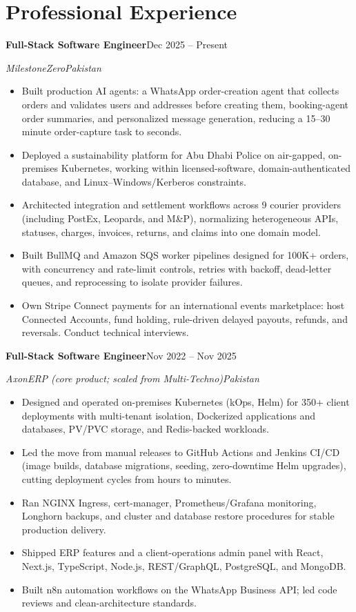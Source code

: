 \documentclass[letterpaper,10pt]{article}
\newcommand{\role}[4]{%
  \textbf{#1}\hfill #2\par
  \textit{#3}\hfill \textit{#4}\par}
\begin{document}
\section{Professional Experience}
\role{Full-Stack Software Engineer}{Dec 2025 -- Present}{MilestoneZero}{Pakistan}
\begin{itemize}
  \item Built production AI agents: a WhatsApp order-creation agent that collects orders and validates users and
        addresses before creating them, booking-agent order summaries, and personalized message generation,
        reducing a 15--30 minute order-capture task to seconds.
  \item Deployed a sustainability platform for Abu Dhabi Police on air-gapped, on-premises Kubernetes, working
        within licensed-software, domain-authenticated database, and Linux--Windows/Kerberos constraints.
  \item Architected integration and settlement workflows across 9 courier providers (including PostEx, Leopards,
        and M\&P), normalizing heterogeneous APIs, statuses, charges, invoices, returns, and claims into one domain model.
  \item Built BullMQ and Amazon SQS worker pipelines designed for 100K+ orders, with concurrency and rate-limit
        controls, retries with backoff, dead-letter queues, and reprocessing to isolate provider failures.
  \item Own Stripe Connect payments for an international events marketplace: host Connected Accounts, fund
        holding, rule-driven delayed payouts, refunds, and reversals. Conduct technical interviews.
\end{itemize}
\vspace{5pt}

\role{Full-Stack Software Engineer}{Nov 2022 -- Nov 2025}{AxonERP (core product; scaled from Multi-Techno)}{Pakistan}
\begin{itemize}
  \item Designed and operated on-premises Kubernetes (kOps, Helm) for 350+ client deployments with multi-tenant
        isolation, Dockerized applications and databases, PV/PVC storage, and Redis-backed workloads.
  \item Led the move from manual releases to GitHub Actions and Jenkins CI/CD (image builds, database migrations,
        seeding, zero-downtime Helm upgrades), cutting deployment cycles from hours to minutes.
  \item Ran NGINX Ingress, cert-manager, Prometheus/Grafana monitoring, Longhorn backups, and cluster and
        database restore procedures for stable production delivery.
  \item Shipped ERP features and a client-operations admin panel with React, Next.js, TypeScript, Node.js,
        REST/GraphQL, PostgreSQL, and MongoDB.
  \item Built n8n automation workflows on the WhatsApp Business API; led code reviews and clean-architecture standards.
\end{itemize}
\end{document}
